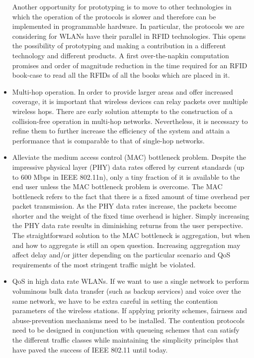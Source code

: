 \documentclass[a4paper,twocolumns]{article}%
\begin{document}
\begin{itemize}
Another opportunity for prototyping is to move to other technologies in which the operation of the protocols is slower and therefore can be implemented in programmable hardware.
In particular, the protocols we are considering for WLANs have their parallel in RFID technologies.
This opens the possibility of prototyping and making a contribution in a different technology and different products.
A first over-the-napkin computation promises and order of magnitude reduction in the time required for an RFID book-case to read all the RFIDs of all the books which are placed in it.
\item Multi-hop operation.
In order to provide larger areas and offer increased coverage, it is important that wireless devices can relay packets over multiple wireless hops.
There are early solution attempts to the construction of a collision-free operation in multi-hop networks.
Nevertheless, it is necessary to refine them to further increase the efficiency of the system and attain a performance that is comparable to that of single-hop networks.
\item Alleviate the medium access control (MAC) bottleneck problem.
Despite the impressive physical layer (PHY) data rates offered by current standards (up to 600 Mbps in IEEE 802.11n), only a tiny fraction of it is available to the end user unless the MAC bottleneck problem is overcome.
The MAC bottleneck refers to the fact that there is a fixed amount of time overhead per packet transmission.
As the PHY data rates increase, the packets become shorter and the weight of the fixed time overhead is higher.
Simply increasing the PHY data rate results in diminishing returns from the user perspective.
The straightforward solution to the MAC bottleneck is aggregation, but when and how to aggregate is still an open question.
Increasing aggregation may affect delay and/or jitter depending on the particular scenario and QoS requirements of the most stringent traffic might be violated. 
\item QoS in high data rate WLANs. 
If we want to use a single network to perform voluminous bulk data transfer (such as backup services) and voice over the same network, we have to be extra careful in setting the contention parameters of the wireless stations.
If applying priority schemes, fairness and abuse-prevention mechanisms need to be installed.
The contention protocols need to be designed in conjunction with queueing schemes that can satisfy the different traffic classes while maintaining the simplicity principles that have paved the success of IEEE 802.11 until today.

\end{itemize}
\end{document}
